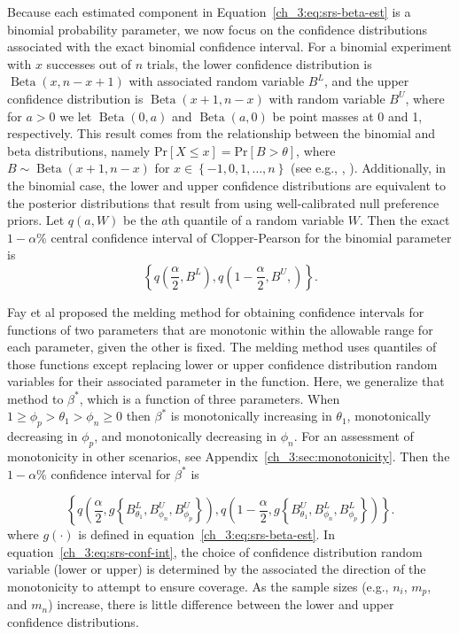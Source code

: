 Because each estimated component in Equation~\ref{ch_3:eq:srs-beta-est} is a binomial probability parameter, we now focus on the confidence distributions associated with the exact binomial confidence interval.
For a binomial experiment with \( x \) successes out of \( n \) trials, the lower confidence distribution is \( \operatorname{Beta}(x, n - x + 1) \) with associated random variable \( B^L \), and the upper confidence distribution is \( \operatorname{Beta}(x + 1, n - x)\) with random variable \( B^U \), where for $a>0$ we let \( \operatorname{Beta}(0,a) \) and \( \operatorname{Beta}(a,0) \) be point masses at 0 and 1, respectively.
This result comes from the relationship between the binomial and beta distributions, namely $\mathrm{Pr}[X \leq x] = \mathrm{Pr}[B > \theta]$, where $B \sim \operatorname{Beta}(x + 1, n - x)$ for $x \in \left\{ -1,0, 1, \ldots, n \right\}$ (see e.g., \cite[Section~2]{Blyth1986}, \cite[Section~S2]{Fay2021}).
Additionally, in the binomial case, the lower and upper confidence distributions are equivalent to
the posterior distributions that result from using well-calibrated null preference priors.\cite{Fay2021}
Let \( q(a, W) \) be the \( a \)th quantile of a random variable \( W \). Then the exact \( 1 - \alpha \)\% central confidence interval of Clopper-Pearson\cite{10.1093/biomet/26.4.404} for the binomial parameter is
\begin{equation}
\left\{ q \left( \frac{\alpha}{2}, B^L \right), q \left( 1 - \frac{\alpha}{2}, B^U, \right) \right\}.
\label{ch_3:eq:C-P}
\end{equation}

Fay et al\cite{FayP:2015} proposed the melding method for obtaining confidence intervals for functions of two parameters that are monotonic within the allowable range for each parameter, given the other is fixed.
The melding method uses quantiles of those functions except replacing lower or upper confidence distribution random variables for their associated parameter in the function.
Here, we generalize that method to $\beta^*$, which is a function of three parameters.
When $1 \geq \phi_p > \theta_1 > \phi_n \geq 0$ then $\beta^*$ is monotonically increasing in $\theta_1$, monotonically decreasing in $\phi_p$, and monotonically decreasing in $\phi_n$.
For an assessment of monotonicity in other scenarios, see Appendix~\ref{ch_3:sec:monotonicity}.
Then the \( 1-\alpha \)\% confidence interval for \( \beta^* \) is

\begin{equation}
    \left\{ q \left( \frac{\alpha}{2}, g \left\{ B_{\theta_1}^L, B_{\phi_n}^U, B_{\phi_p}^U \right\} \right),
            q \left( 1 - \frac{\alpha}{2}, g \left\{ B_{\theta_1}^U, B_{\phi_n}^L, B_{\phi_p}^L \right\}   \right) \right\}.
\label{ch_3:eq:srs-conf-int}
\end{equation}
where $g(\cdot)$ is defined in equation~\ref{ch_3:eq:srs-beta-est}.
In equation~\ref{ch_3:eq:srs-conf-int}, the choice of confidence distribution random variable (lower or upper) is determined by the associated the direction of the monotonicity to attempt to ensure coverage.
As the sample sizes (e.g., $n_i$, $m_p$, and $m_n$) increase, there is little difference between the lower and upper confidence distributions.


